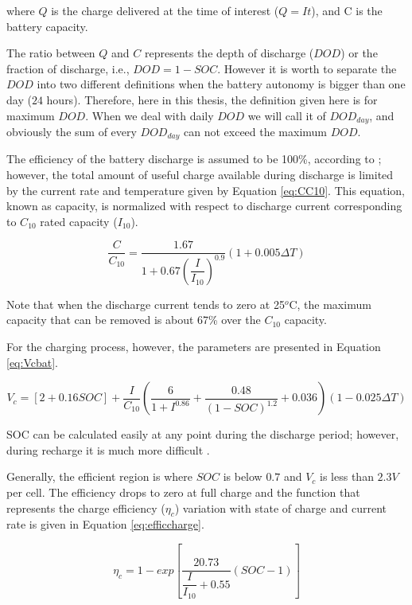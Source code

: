 \noindent where $ Q $ is the charge delivered at the time of interest ($ Q=It $), and C is the battery capacity.

The ratio between $ Q $ and $ C $ represents the depth of discharge ($ DOD $) or the fraction of discharge, i.e., $ DOD=1-SOC $.
However it is worth to separate the $DOD$ into two different definitions when the battery autonomy is bigger than one day ($24$ hours). Therefore, here in this thesis, the definition given here is for maximum $DOD$. When we deal with daily $DOD$ we will call it of $DOD_{day}$, and obviously the sum of every $DOD_{day}$ can not exceed the maximum $DOD$.

The efficiency of the battery discharge is assumed to be 100\%, according to \cite{Copetti}; however, the total amount of useful charge available during discharge is limited by the current rate and temperature given by Equation \ref{eq:CC10}. This equation, known as capacity, is normalized with respect to discharge current corresponding to $ C_{10} $ rated capacity ($ I_{10} $).

\begin{equation}
\label{eq:CC10}
\dfrac{C}{C_{10}} = \dfrac{1.67}{1+0.67 \left( \dfrac{I}{I_{10}} \right)^{0.9} }(1+0.005 \Delta T)
\end{equation}

Note that when the discharge current tends to zero at 25$^{o}$C, the maximum capacity that can be removed is about 67\% over the $C_{10}$ capacity.

For the charging process, however, the parameters are presented in Equation \ref{eq:Vcbat}.

\begin{equation}
\label{eq:Vcbat}
V_{c} = [2+0.16SOC]+ \dfrac{I}{C_{10}} \left( \dfrac{6}{1+I^{0.86}} + \dfrac{0.48}{(1-SOC)^{1.2}} + 0.036  \right) (1-0.025 \Delta T)
\end{equation}

SOC can be calculated easily at any point during the discharge period; however, during recharge it is much more difficult \cite{Copetti}.

Generally, the efficient region is where $ SOC $ is below $ 0.7 $ and $ V_{c} $ is less than $2.3 V$ per cell. The efficiency drops to zero at full charge and the function that represents the charge efficiency ($ \eta_{c} $) variation with state of charge and current rate is given in Equation \ref{eq:efficcharge}.

\begin{equation}
\label{eq:efficcharge}
\eta_{c} = 1 - exp \left[ \dfrac{20.73}{\dfrac{I}{I_{10}}+0.55} (SOC-1) \right] 
\end{equation}

